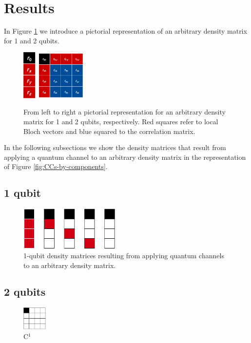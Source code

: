 \documentclass[11pt,dvipsnames]{article}
\begin{document}
\section*{Results}
In Figure \ref{fig:pictorial-rep-rho} we introduce a pictorial representation 
of an arbitrary density matrix for 1 and 2 qubits.
\begin{figure}[H]
	\centering
	\hfill \hfill
	\includegraphics[height=2.5cm]
	{img/tablero-1q}
	\hfill
	\includegraphics[width=2.5cm]
	{img/rho2q(2)}
	\hfill \hfill
	\caption{From left to right a pictorial representation for an arbitrary
	density matrix for 1 and 2 qubits, respectively. Red squares refer to local
	Bloch vectors and blue squared to the correlation matrix.}
	\label{fig:pictorial-rep-rho}
\end{figure}
In the following subsections we show the density matrices that result from
applying a quantum channel to an arbitrary density matrix in the representation
of Figure \ref{fig:CCs-by-components}.

\subsection*{1 qubit}
\begin{figure}[H]
	\centering
	\includegraphics[width=5cm]
	{img/1q-CCs.png}
	\caption{1-qubit density matrices resulting from applying quantum channels
	to an arbitrary density matrix.}
\end{figure}

\subsection*{2 qubits}
\begin{figure}[H]
	\centering
  \includegraphics[height=1.2cm]
	{img/C16.png}
	\caption{C${}^{1}$}
\end{figure}
\end{document}
